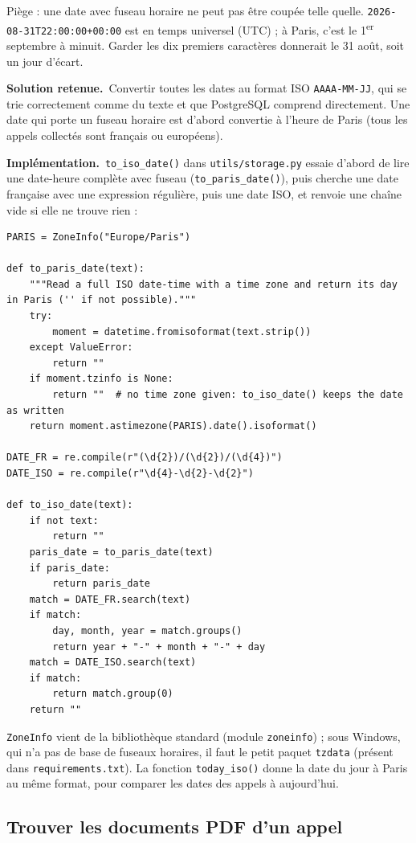 \documentclass[11pt,a4paper]{article}
\newcommand{\sol}{\par\medskip\noindent\textbf{\textcolor{solcolor}{Solution retenue.}}\ }
\newcommand{\impl}{\par\medskip\noindent\textbf{\textcolor{implcolor}{Implémentation.}}\ }
\newcommand{\code}[1]{\texttt{#1}}
\begin{document}
Piège : une date avec fuseau horaire ne peut pas être coupée telle quelle.
\code{2026-08-31T22:00:00+00:00} est en temps universel (UTC) ; à Paris, c'est le
1\textsuperscript{er} septembre à minuit. Garder les dix premiers caractères donnerait
le 31 août, soit un jour d'écart.

\sol Convertir toutes les dates au format ISO \code{AAAA-MM-JJ}, qui se trie correctement
comme du texte et que PostgreSQL comprend directement. Une date qui porte un fuseau
horaire est d'abord convertie à l'heure de Paris (tous les appels collectés sont français
ou européens).

\impl \code{to\_iso\_date()} dans \code{utils/storage.py} essaie d'abord de lire une
date-heure complète avec fuseau (\code{to\_paris\_date()}), puis cherche une date
française avec une expression régulière, puis une date ISO, et renvoie une chaîne vide
si elle ne trouve rien :

\begin{lstlisting}
PARIS = ZoneInfo("Europe/Paris")

def to_paris_date(text):
    """Read a full ISO date-time with a time zone and return its day in Paris ('' if not possible)."""
    try:
        moment = datetime.fromisoformat(text.strip())
    except ValueError:
        return ""
    if moment.tzinfo is None:
        return ""  # no time zone given: to_iso_date() keeps the date as written
    return moment.astimezone(PARIS).date().isoformat()

DATE_FR = re.compile(r"(\d{2})/(\d{2})/(\d{4})")
DATE_ISO = re.compile(r"\d{4}-\d{2}-\d{2}")

def to_iso_date(text):
    if not text:
        return ""
    paris_date = to_paris_date(text)
    if paris_date:
        return paris_date
    match = DATE_FR.search(text)
    if match:
        day, month, year = match.groups()
        return year + "-" + month + "-" + day
    match = DATE_ISO.search(text)
    if match:
        return match.group(0)
    return ""
\end{lstlisting}

\code{ZoneInfo} vient de la bibliothèque standard (module \code{zoneinfo}) ; sous Windows,
qui n'a pas de base de fuseaux horaires, il faut le petit paquet \code{tzdata}
(présent dans \code{requirements.txt}). La fonction \code{today\_iso()} donne la date du
jour à Paris au même format, pour comparer les dates des appels à aujourd'hui.

\subsection{Trouver les documents PDF d'un appel}
\end{document}
